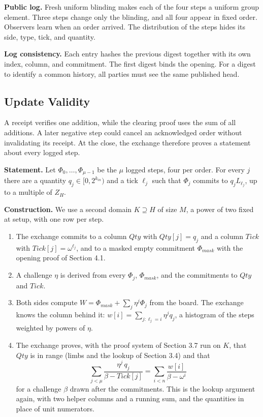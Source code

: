 \textbf{Public log.} Fresh uniform blinding makes each of the four steps a uniform group element. Three steps change only the blinding, and all four appear in fixed order. Observers learn when an order arrived. The distribution of the steps hides its side, type, tick, and quantity.

\textbf{Log consistency.} Each entry hashes the previous digest together with its own index, column, and commitment. The first digest binds the opening. For a digest to identify a common history, all parties must see the same published head.

\subsection{Update Validity}
\label{app:zq-update-validity}

A receipt verifies one addition, while the clearing proof uses the sum of all additions. A later negative step could cancel an acknowledged order without invalidating its receipt. At the close, the exchange therefore proves a statement about every logged step.

\textbf{Statement.} Let \(\Phi_0, \ldots, \Phi_{\mu-1}\) be the \(\mu\) logged steps, four per order. For every \(j\) there are a quantity \(q_j \in [0, 2^{k_{in}})\) and a tick \(\ell_j\) such that \(\Phi_j\) commits to \(q_j L_{\ell_j}\), up to a multiple of \(Z_H\).

\textbf{Construction.} We use a second domain \(K \supseteq H\) of size \(M\), a power of two fixed at setup, with one row per step.

\begin{enumerate}
\def\labelenumi{\arabic{enumi}.}
\item
  The exchange commits to a column \(Qty\) with \(Qty[j] = q_j\) and a column \(Tick\) with \(Tick[j] = \omega^{\ell_j}\), and to a masked empty commitment \(\Phi_{mask}\) with the opening proof of Section 4.1.
\item
  A challenge \(\eta\) is derived from every \(\Phi_j\), \(\Phi_{mask}\), and the commitments to \(Qty\) and \(Tick\).
\item
  Both sides compute \(W = \Phi_{mask} + \sum_j \eta^j \Phi_j\) from the board. The exchange knows the column behind it: \(w[i] = \sum_{j : \ell_j = i} \eta^j q_j\), a histogram of the steps weighted by powers of \(\eta\).
\item
  The exchange proves, with the proof system of Section 3.7 run on \(K\), that \(Qty\) is in range (limbs and the lookup of Section 3.4) and that
  \[\sum_{j<\mu} \frac{\eta^j\, q_j}{\beta - Tick[j]} = \sum_{i<n} \frac{w[i]}{\beta - \omega^i}\]
  for a challenge \(\beta\) drawn after the commitments. This is the lookup argument again, with two helper columns and a running sum, and the quantities in place of unit numerators.
\end{enumerate}

